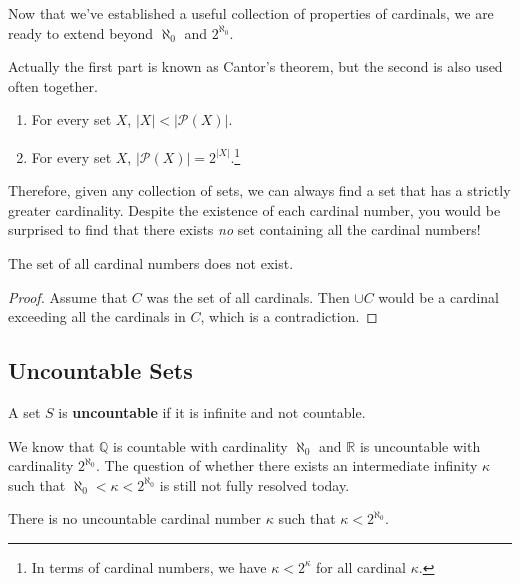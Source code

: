   Now that we've established a useful collection of properties of cardinals, we are ready to extend beyond $\aleph_0$ and $2^{\aleph_0}$. 

  \begin{theorem} 
    Actually the first part is known as Cantor's theorem, but the second is also used often together. 
    \begin{enumerate}
      \item For every set $X$, $|X| < |\mathcal{P}(X)|$. 
      \item For every set $X$, $|\mathcal{P}(X)| = 2^{|X|}$.\footnote{In terms of cardinal numbers, we have $\kappa < 2^\kappa$ for all cardinal $\kappa$.}
    \end{enumerate}
  \end{theorem} 

  Therefore, given any collection of sets, we can always find a set that has a strictly greater cardinality. Despite the existence of each cardinal number, you would be surprised to find that there exists \textit{no} set containing all the cardinal numbers! 

  \begin{theorem}
    The set of all cardinal numbers does not exist. 
  \end{theorem}
  \begin{proof}
    Assume that $C$ was the set of all cardinals. Then $\cup C$ would be a cardinal exceeding all the cardinals in $C$, which is a contradiction. 
  \end{proof}

\subsection{Uncountable Sets} 

  \begin{definition}
    A set $S$ is \textbf{uncountable} if it is infinite and not countable. 
  \end{definition}

  We know that $\mathbb{Q}$ is countable with cardinality $\aleph_0$ and $\mathbb{R}$ is uncountable with cardinality $2^{\aleph_0}$. The question of whether there exists an intermediate infinity $\kappa$ such that $\aleph_0 < \kappa < 2^{\aleph_0}$ is still not fully resolved today. 

  \begin{theorem}
    There is no uncountable cardinal number $\kappa$ such that $\kappa < 2^{\aleph_0}$. 
  \end{theorem}

